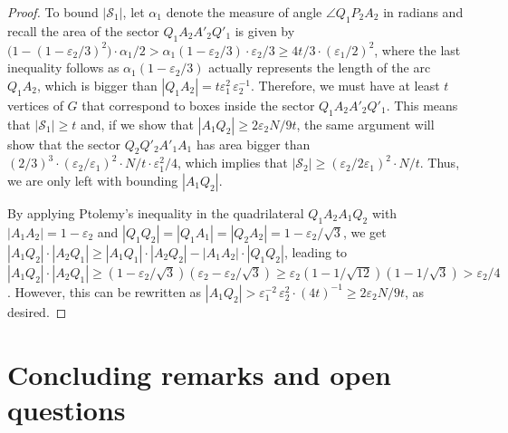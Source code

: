 \documentclass[12pt]{article}
\newcommand{\eps}{\varepsilon}
\begin{document}
\begin{proof}
   To bound $|\mathcal{S}_1|$, let $\alpha_1$ denote the measure of angle $\angle Q_1P_2A_2$ in radians and recall the area of the sector $Q_1A_2A'_2Q'_1$ is given by $\big(1-(1-\varepsilon_2/3)^2\big)\cdot \alpha_1/2>\alpha_1(1-\eps_2/3)\cdot \eps_2/3\geq 4t/3\cdot (\eps_1/2)^2$, where the last inequality follows as $\alpha_1(1-\eps_2/3)$ actually represents the length of the arc $Q_1A_2$, which is bigger than $|Q_1A_2|=t\eps_1^{2\ }\eps_2^{-1}$.
    Therefore, we must have at least $t$ vertices of $G$ that correspond to boxes inside the sector $Q_1A_2A'_2Q'_1$. This means that $|\mathcal{S}_1|\geq t$ and, if we show that $|A_1Q_2|\geq 2\eps_{2}N/9t$, the same argument will show that the sector $Q_2Q'_2A'_1A_1$ has area bigger than $(2/3)^3\cdot (\eps_2/\eps_1)^2\cdot N/t\cdot \eps_1^2/4$, which implies that $|\mathcal{S}_2|\geq (\eps_2/2\eps_1)^2\cdot N/t$. Thus, we are only left with bounding $|A_1Q_2|$.    

   By applying Ptolemy's inequality in the quadrilateral $Q_1A_2A_1Q_2$ with $|A_1A_2|=1-\eps_2$ and $|Q_1Q_2|=|Q_1A_1|=|Q_2A_2|=1-\eps_2/\sqrt{3}$, we get $|A_1Q_2|\cdot |A_2Q_1|\geq |A_1Q_1|\cdot|A_2Q_2|-|A_1A_2|\cdot|Q_1Q_2|$, leading to $|A_1Q_2|\cdot |A_2Q_1|\geq \left(1-\eps_2/\sqrt{3}\right)\left(\eps_2-\eps_2/\sqrt{3}\right)\geq \eps_2\left(1-1/\sqrt{12}\right)\left(1-1/\sqrt{3}\right) >\eps_2/4$. However, this can be rewritten as $|A_1Q_2|>\eps_1^{-2\ }\eps_2^2\cdot (4t)^{-1}\ge2\eps_{2}N/9t$, as desired.
\end{proof}

\section{Concluding remarks and open questions}\label{sec:conclude}
\end{document}

